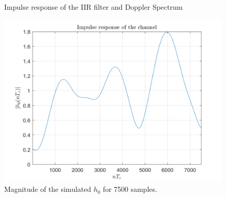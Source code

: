 \documentclass[a4paper, 12pt]{report}
\begin{document}
\begin{figure}[H]
	\centering
	\caption{Impulse response of the IIR filter and Doppler Spectrum}
	\label{DS}
\end{figure}

\begin{figure}[H]
	\centering
	\includegraphics[width=14cm]{images/h0_7500}
	\caption{Magnitude of the simulated $h_0$ for 7500 samples.}\label{h0_7500}
\end{figure}
\end{document}
